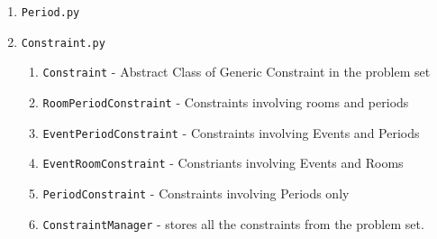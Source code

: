 \documentclass{article}
\newcommand{\inlinecode}[1]{\colorbox{gray!20}{\texttt{#1}}}
\begin{document}
\begin{enumerate}
\begin{enumerate}
    \end{enumerate}
    \item \inlinecode{Period.py}
    \item \inlinecode{Constraint.py}
    \begin{enumerate}
        \item \inlinecode{Constraint} - Abstract Class of Generic Constraint in the problem set
        \item \inlinecode{RoomPeriodConstraint} - Constraints involving rooms and periods
        \item \inlinecode{EventPeriodConstraint} - Constraints involving Events and Periods
        \item \inlinecode{EventRoomConstraint} - Constriants involving Events and Rooms
        \item \inlinecode{PeriodConstraint} - Constraints involving Periods only
        \item \inlinecode{ConstraintManager} - stores all the constraints from the problem set.
    \end{enumerate}
\end{enumerate}
\end{document}
